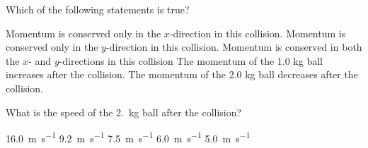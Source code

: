 \documentclass{../../oss-apphys-exam}
\begin{document}
\begin{multicols*}{2}
\begin{questions}

    \question Which of the following statements is true?
    \label{bfa1}
    \begin{choices}    
      \choice Momentum is conserved only in the $x$-direction in this collision.
      \choice Momentum is conserved only in the $y$-direction in this collision.
      \choice Momentum is conserved in both the $x$- and $y$-directions in this
      collision
      \choice The momentum of the 1.0 kg ball increases after the collision.
      \choice The momentum of the 2.0 kg ball decreases after the collision.
    \end{choices}
    
    \question What is the speed of the \SI{2.}{\kilo\gram} ball after the
    collision?
    \label{bfa2}
    \begin{choices}
      \choice\SI{16.0}{\metre\per\second}
      \choice\SI{9.2}{\metre\per\second}
      \choice\SI{7.5}{\metre\per\second}
      \choice\SI{6.0}{\metre\per\second}
      \choice\SI{5.0}{\metre\per\second}
    \end{choices}
    

\end{questions}
\end{multicols*}
\end{document}
